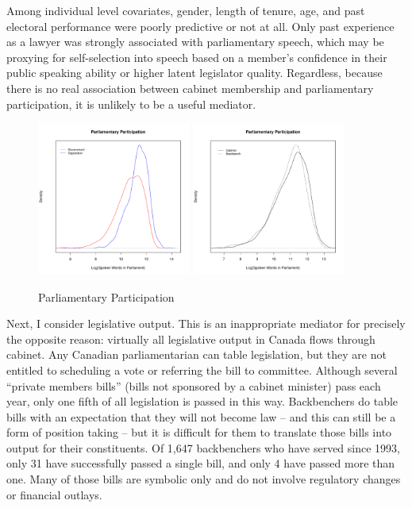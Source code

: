 \documentclass[letter,12pt]{article}
\begin{document}
Among individual level covariates, gender, length of tenure, age, and past electoral performance were poorly predictive or not at all. Only past experience as a lawyer was strongly associated with parliamentary speech, which may be proxying for self-selection into speech based on a member's confidence in their public speaking ability or higher latent legislator quality. Regardless, because there is no real association between cabinet membership and parliamentary participation, it is unlikely to be a useful mediator.

\begin{figure}
\centering
\caption{Parliamentary Participation}
\includegraphics[width=0.45\textwidth]{"Includes/participation_govopp"}
\includegraphics[width=0.45\textwidth]{"Includes/participation_cabinet"}
\end{figure}

Next, I consider legislative output. This is an inappropriate mediator for precisely the opposite reason: virtually all legislative output in Canada flows through cabinet. Any Canadian parliamentarian can table legislation, but they are not entitled to scheduling a vote or referring the bill to committee. Although several ``private members bills'' (bills not sponsored by a cabinet minister) pass each year, only one fifth of all legislation is passed in this way. Backbenchers do table bills with an expectation that they will not become law -- and this can still be a form of position taking -- but it is difficult for them to translate those bills into output for their constituents. Of 1,647 backbenchers who have served since 1993, only 31 have successfully passed a single bill, and only 4 have passed more than one. Many of those bills are symbolic only and do not involve regulatory changes or financial outlays.
\end{document}
